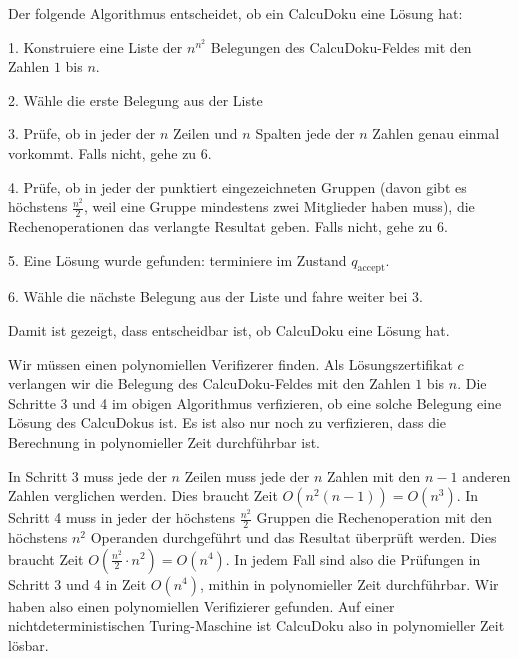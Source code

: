 \begin{loesung}
\begin{teilaufgaben}
\item
Der folgende Algorithmus entscheidet, ob ein CalcuDoku eine Lösung
hat:
\begin{compactenum}
\item[1.] Konstruiere eine Liste der $n^{n^2}$ Belegungen des CalcuDoku-Feldes
mit den Zahlen $1$ bis $n$.
\item[2.] Wähle die erste Belegung aus der Liste
\item[3.] Prüfe, ob in jeder der $n$ Zeilen und $n$ Spalten jede der
$n$ Zahlen genau einmal vorkommt. Falls nicht, gehe zu 6.
\item[4.] Prüfe, ob in jeder der punktiert eingezeichneten Gruppen
(davon gibt es höchstens $\frac{n^2}2$, weil eine Gruppe mindestens
zwei Mitglieder haben muss), die Rechenoperationen das verlangte Resultat
geben. Falls nicht, gehe zu 6.
\item[5.]
Eine Lösung wurde gefunden: terminiere im Zustand $q_{\text{accept}}$.
\item[6.]
Wähle die nächste Belegung aus der Liste und fahre weiter bei 3.
\end{compactenum}
Damit ist gezeigt, dass entscheidbar ist, ob CalcuDoku eine Lösung
hat.
\item
Wir müssen einen polynomiellen Verifizerer finden. Als Lösungszertifikat
$c$ verlangen wir die Belegung des CalcuDoku-Feldes mit den Zahlen
$1$ bis $n$.
Die Schritte 3 und 4 im obigen Algorithmus verfizieren, ob eine solche
Belegung eine Lösung des CalcuDokus ist. Es ist also nur noch zu verfizieren,
dass die Berechnung in polynomieller Zeit durchführbar ist.

In Schritt 3 muss jede der $n$ Zeilen muss jede der $n$ Zahlen mit den
$n-1$ anderen Zahlen verglichen werden. Dies braucht Zeit $O(n^2(n-1))=O(n^3)$.
In Schritt 4 muss in jeder der höchstens $\frac{n^2}2$ Gruppen die 
Rechenoperation mit den höchstens $n^2$ Operanden durchgeführt und das
Resultat überprüft werden. Dies braucht Zeit $O(\frac{n^2}2\cdot n^2)=O(n^4)$.
In jedem Fall sind also die Prüfungen in Schritt 3 und 4 in Zeit $O(n^4)$,
mithin in polynomieller Zeit durchführbar. Wir haben also einen polynomiellen
Verifizierer gefunden.
Auf einer nichtdeterministischen Turing-Maschine ist CalcuDoku also
in polynomieller Zeit lösbar.
\qedhere
\end{teilaufgaben}
\end{loesung}
